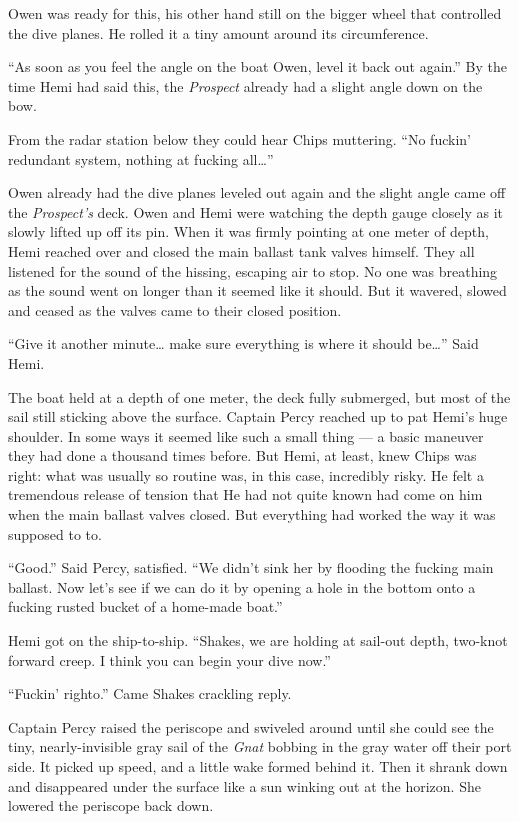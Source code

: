 \documentclass[
]{scrbook}
\begin{document}
Owen was ready for this, his other hand still on the bigger wheel that
controlled the dive planes. He rolled it a tiny amount around its
circumference.

``As soon as you feel the angle on the boat Owen, level it back out
again.'' By the time Hemi had said this, the \emph{Prospect} already had
a slight angle down on the bow.

From the radar station below they could hear Chips muttering. ``No
fuckin' redundant system, nothing at fucking all\ldots{}''

Owen already had the dive planes leveled out again and the slight angle
came off the \emph{Prospect's} deck. Owen and Hemi were watching the
depth gauge closely as it slowly lifted up off its pin. When it was
firmly pointing at one meter of depth, Hemi reached over and closed the
main ballast tank valves himself. They all listened for the sound of the
hissing, escaping air to stop. No one was breathing as the sound went on
longer than it seemed like it should. But it wavered, slowed and ceased
as the valves came to their closed position.

``Give it another minute\ldots{} make sure everything is where it should
be\ldots{}'' Said Hemi.

The boat held at a depth of one meter, the deck fully submerged, but
most of the sail still sticking above the surface. Captain Percy reached
up to pat Hemi's huge shoulder. In some ways it seemed like such a small
thing --- a basic maneuver they had done a thousand times before. But
Hemi, at least, knew Chips was right: what was usually so routine was,
in this case, incredibly risky. He felt a tremendous release of tension
that He had not quite known had come on him when the main ballast valves
closed. But everything had worked the way it was supposed to to.

``Good.'' Said Percy, satisfied. ``We didn't sink her by flooding the
fucking main ballast. Now let's see if we can do it by opening a hole in
the bottom onto a fucking rusted bucket of a home-made boat.''

Hemi got on the ship-to-ship. ``Shakes, we are holding at sail-out
depth, two-knot forward creep. I think you can begin your dive now.''

``Fuckin' righto.'' Came Shakes crackling reply.

Captain Percy raised the periscope and swiveled around until she could
see the tiny, nearly-invisible gray sail of the \emph{Gnat} bobbing in
the gray water off their port side. It picked up speed, and a little
wake formed behind it. Then it shrank down and disappeared under the
surface like a sun winking out at the horizon. She lowered the periscope
back down.
\end{document}
